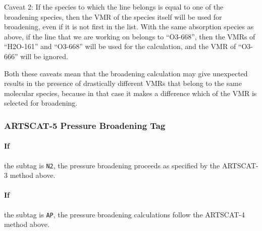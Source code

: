 Caveat 2: If the species to which the line belongs is equal to one of
the broadening species, then the VMR of the species itself will be
used for broadening, even if it is not first in the list. With the
same absorption species as above, if the line that we are working on
belongs to ``O3-668'', then the VMRs of ``H2O-161'' and ``O3-668''
will be used for the calculation, and the VMR of ``O3-666'' will be
ignored. 

Both these caveats mean that the broadening calculation may
give unexpected results in the presence of drastically different VMRs
that belong to the same molecular species, because in that case it makes a
difference which of the VMR is selected for broadening.

\subsubsection{ARTSCAT-5 Pressure Broadening Tag}
\paragraph*{If} the subtag is \verb|N2|, 
the pressure broadening proceeds as specified by the ARTSCAT-3 method above.

\paragraph*{If} the subtag is \verb|AP|,
the pressure broadening  calculations follow the ARTSCAT-4 method above.

